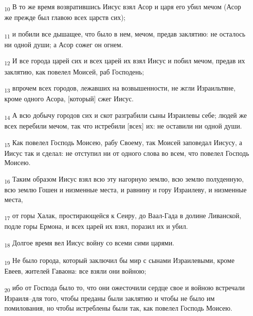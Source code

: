 \begin{tcolorbox}
\textsubscript{10} В то же время возвратившись Иисус взял Асор и царя его убил мечом (Асор же прежде был главою всех царств сих);
\end{tcolorbox}
\begin{tcolorbox}
\textsubscript{11} и побили все дышащее, что было в нем, мечом, предав заклятию: не осталось ни одной души; а Асор сожег он огнем.
\end{tcolorbox}
\begin{tcolorbox}
\textsubscript{12} И все города царей сих и всех царей их взял Иисус и побил мечом, предав их заклятию, как повелел Моисей, раб Господень;
\end{tcolorbox}
\begin{tcolorbox}
\textsubscript{13} впрочем всех городов, лежавших на возвышенности, не жгли Израильтяне, кроме одного Асора, [который] сжег Иисус.
\end{tcolorbox}
\begin{tcolorbox}
\textsubscript{14} А всю добычу городов сих и скот разграбили сыны Израилевы себе; людей же всех перебили мечом, так что истребили [всех] их: не оставили ни одной души.
\end{tcolorbox}
\begin{tcolorbox}
\textsubscript{15} Как повелел Господь Моисею, рабу Своему, так Моисей заповедал Иисусу, а Иисус так и сделал: не отступил ни от одного слова во всем, что повелел Господь Моисею.
\end{tcolorbox}
\begin{tcolorbox}
\textsubscript{16} Таким образом Иисус взял всю эту нагорную землю, всю землю полуденную, всю землю Гошен и низменные места, и равнину и гору Израилеву, и низменные места,
\end{tcolorbox}
\begin{tcolorbox}
\textsubscript{17} от горы Халак, простирающейся к Сеиру, до Ваал-Гада в долине Ливанской, подле горы Ермона, и всех царей их взял, поразил их и убил.
\end{tcolorbox}
\begin{tcolorbox}
\textsubscript{18} Долгое время вел Иисус войну со всеми сими царями.
\end{tcolorbox}
\begin{tcolorbox}
\textsubscript{19} Не было города, который заключил бы мир с сынами Израилевыми, кроме Евеев, жителей Гаваона: все взяли они войною;
\end{tcolorbox}
\begin{tcolorbox}
\textsubscript{20} ибо от Господа было то, что они ожесточили сердце свое и войною встречали Израиля--для того, чтобы преданы были заклятию и чтобы не было им помилования, но чтобы истреблены были так, как повелел Господь Моисею.
\end{tcolorbox}
